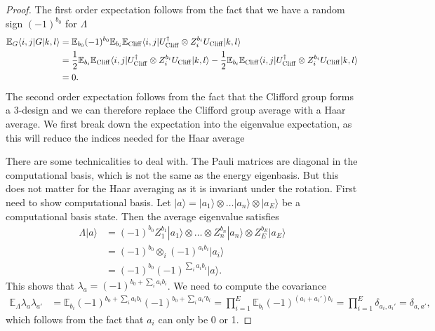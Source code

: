 \documentclass[
 amsmath,amssymb,
 aps,
onecolumn, 
nofootinbib]{revtex4-2}
\newcommand{\ket}[1]{|#1\rangle}
\newcommand{\bra}[1]{\langle #1|}
\newcommand{\EE}{\mathbb{E}}
\newcommand{\tp}{\otimes}
\begin{document}
\begin{proof}
The first order expectation follows from the fact that we have a random sign $(-1)^{b_0}$ for $\Lambda$
\begin{align}
    \EE_G \bra{i,j} G \ket{k,l} &= \EE_{b_0} (-1)^{b_0} \EE_{b_i} \EE_{\rm Cliff} \bra{i,j} U_{\rm Cliff}^\dagger \tp Z_i^{b_i} U_{\rm Cliff} \ket{k,l} \nonumber \\
    &= \frac{1}{2}  \EE_{b_i} \EE_{\rm Cliff} \bra{i,j} U_{\rm Cliff}^\dagger \tp Z_i^{b_i} U_{\rm Cliff} \ket{k,l} - \frac{1}{2}  \EE_{b_i} \EE_{\rm Cliff} \bra{i,j} U_{\rm Cliff}^\dagger \tp Z_i^{b_i} U_{\rm Cliff} \ket{k,l} \nonumber \\
    &= 0.
\end{align}
The second order expectation follows from the fact that the Clifford group forms a 3-design \cite{webb2015clifford} and we can therefore replace the Clifford group average with a Haar average. We first break down the expectation into the eigenvalue expectation, as this will reduce the indices needed for the Haar average

There are some technicalities to deal with. The Pauli matrices are diagonal in the computational basis, which is not the same as the energy eigenbasis. But this does not matter for the Haar averaging as it is invariant under the rotation. First need to show computational basis. Let $\ket{a} = \ket{a_1} \tp \ldots \ket{a_n} \tp \ket{a_E}$ be a computational basis state. Then the average eigenvalue satisfies
\begin{align}
     \Lambda \ket{a}  &= (-1)^{b_0} Z_1^{b_1} \ket{a_1} \tp \ldots \tp Z_n^{b_n} \ket{a_n} \tp Z_E^{b_E} \ket{a_E} \\
    &= (-1)^{b_0} \tp_i (-1)^{a_i b_i} \ket{a_i} \\
    &= (-1)^{b_0} (-1)^{\sum_i a_i b_i} \ket{a}.
\end{align}
This shows that $\lambda_a = (-1)^{b_0 + \sum_{i} a_i b_i}$. We need to compute the covariance
\begin{align}
    \EE_\Lambda \lambda_a \lambda_{a'} &= \EE_{b_i} (-1)^{b_0 + \sum_{i} a_i b_i} (-1)^{b_0 + \sum_{i} a_i' b_i} = \prod_{i = 1}^{E} \EE_{b_i} (-1)^{(a_i + a_i') b_i} = \prod_{i = 1}^E  \delta_{a_i, a_i'} = \delta_{a, a'},
\end{align}
which follows from the fact that $a_i$ can only be 0 or 1. 


\end{proof}
\end{document}
